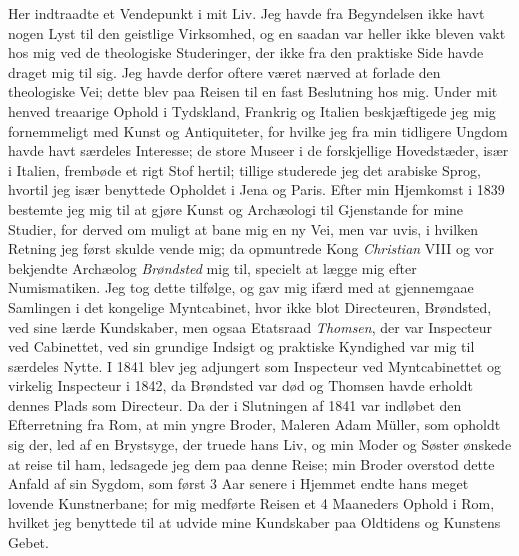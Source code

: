 \documentclass[12pt,a4paper]{article}
\newcommand{\opage}[1]{\marginnote{\footnotesize\textit{[#1]}}}
\begin{document}
Her indtraadte et Vendepunkt i mit Liv. Jeg havde fra Begyndelsen ikke havt nogen
Lyst til den geistlige Virksomhed, og en saadan var heller ikke bleven vakt hos
mig ved de theologiske Studeringer, der ikke fra den praktiske Side havde draget
mig til sig. Jeg havde derfor oftere været nærved at forlade den theologiske Vei;
dette blev paa Reisen til en fast Beslutning hos
\opage{42} mig. Under mit henved treaarige Ophold i Tydskland, Frankrig og Italien
beskjæftigede jeg mig fornemmeligt med Kunst og Antiquiteter, for hvilke jeg fra
min tidligere Ungdom havde havt særdeles Interesse; de store Museer i de
forskjellige Hovedstæder, især i Italien, frembøde et rigt Stof hertil; tillige
studerede jeg det arabiske Sprog, hvortil jeg især benyttede Opholdet i Jena og
Paris. Efter min Hjemkomst i 1839 bestemte jeg mig til at gjøre Kunst og
Archæologi til Gjenstande for mine Studier, for derved om muligt at bane mig en ny
Vei, men var uvis, i hvilken Retning jeg først skulde vende mig; da opmuntrede
Kong \emph{Christian} VIII og vor bekjendte Archæolog \emph{Brøndsted} mig til,
specielt at lægge mig efter Numismatiken. Jeg tog dette tilfølge, og gav mig
ifærd med at gjennemgaae Samlingen i det kongelige Myntcabinet, hvor ikke blot
Directeuren, Brøndsted, ved sine lærde Kundskaber, men ogsaa Etatsraad
\emph{Thomsen}, der var Inspecteur ved Cabinettet, ved sin grundige Indsigt og
praktiske Kyndighed var mig til særdeles Nytte. I 1841 blev jeg adjungert som
Inspecteur ved Myntcabinettet og virkelig Inspecteur i 1842, da Brøndsted var død
og Thomsen havde erholdt dennes Plads som Directeur. Da der i Slutningen af 1841
var indløbet den Efterretning fra Rom, at min yngre Broder, Maleren Adam Müller,
som opholdt sig der, led af en Brystsyge, der truede hans Liv, og min Moder og
Søster ønskede at reise til ham, ledsagede jeg dem paa denne Reise; min Broder
overstod dette Anfald af sin Sygdom, som først 3 Aar senere i Hjemmet endte hans
meget lovende Kunstnerbane; for mig medførte Reisen et 4 Maaneders Ophold i Rom,
hvilket jeg benyttede til at udvide mine Kundskaber paa Oldtidens og Kunstens
Gebet.
\end{document}
